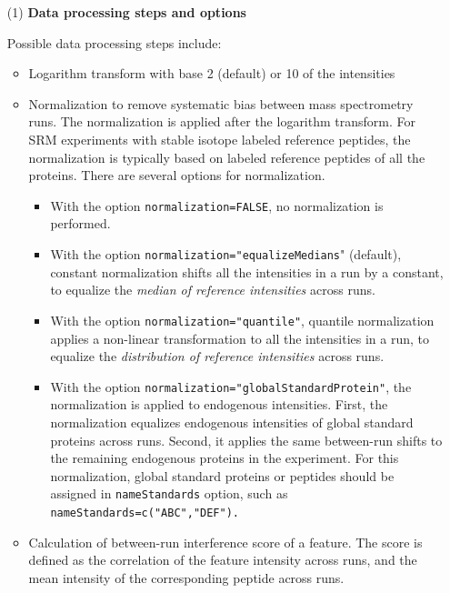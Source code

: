 \documentclass[11pt]{article}
\begin{document}
\begin{enumerate}
\item[(1)] {\bf Data processing steps and options}

Possible data processing steps include:
\begin{itemize}
\item Logarithm transform with base 2 (default) or 10 of the intensities
\item Normalization to remove systematic bias between mass spectrometry runs. The normalization is applied after the logarithm transform. For SRM experiments with stable isotope labeled reference peptides, the normalization is typically based on labeled reference peptides of all the proteins. There are several options for normalization.

\begin{itemize}
\item With the option {\tt normalization=FALSE}, no normalization is performed.

\item With the option {\tt normalization="equalizeMedians}" (default), constant normalization shifts all the intensities in a run by a constant, to equalize the {\it median of reference intensities} across runs.

\item With the option {\tt normalization="quantile"}, quantile normalization~\citep{Amaratunga:2001ie} applies a non-linear transformation to all the intensities in a run, to equalize the {\it distribution of reference intensities} across runs. 

\item With the option {\tt normalization="globalStandardProtein"}, the normalization is applied to endogenous intensities. First, the normalization equalizes endogenous intensities of global standard proteins across runs. Second, it applies the same between-run shifts to the remaining endogenous proteins in the experiment. For this normalization, global standard proteins or peptides should be assigned in {\tt nameStandards} option, such as {\tt nameStandards=c("ABC","DEF").}
\end{itemize}

\item Calculation of between-run interference score of a feature. The score is defined as the correlation of the feature intensity across runs, and the mean intensity of the corresponding peptide across runs.


\end{itemize}
\end{enumerate}
\end{document}
